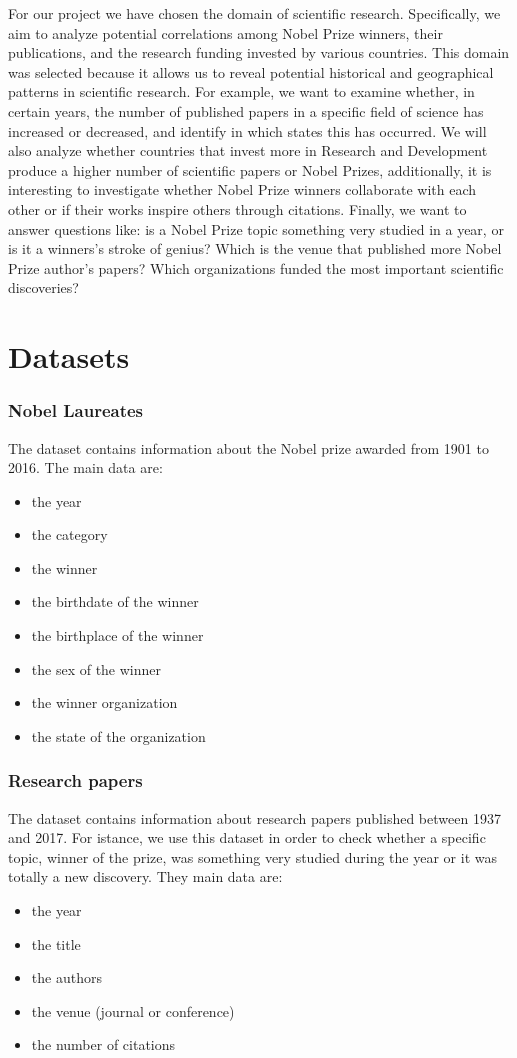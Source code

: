 \documentclass{article}
\begin{document}
For our project we have chosen the domain of scientific research. Specifically, we aim to analyze potential correlations among Nobel Prize winners,
their publications, and the research funding invested by various countries. This domain was selected because it allows us to reveal potential historical
and geographical patterns in scientific research. 
For example, we want to examine whether, in certain years, the number of published papers in a specific field of science has increased or decreased, and
identify in which states this has occurred. We will also analyze whether countries that invest more in Research and Development produce a higher number
of scientific papers or Nobel Prizes, additionally, it is interesting to investigate whether Nobel Prize winners
collaborate with each other or if their works inspire others through citations. Finally, we want to answer questions like: is a Nobel Prize topic something
very studied in a year, or is it a winners's stroke of genius? Which is the venue that published more Nobel Prize author's papers? Which organizations
funded the most important scientific discoveries?
\section*{Datasets}
\subsubsection*{Nobel Laureates}
The dataset contains information about the Nobel prize awarded from 1901 to 2016. The main data are:
\begin{multicols}{2}
  \begin{itemize}
    \item the year
    \item the category
    \item the winner
    \item the birthdate of the winner
    \item the birthplace of the winner
    \item the sex of the winner
    \item the winner organization
    \item the state of the organization
  \end{itemize}
  \end{multicols}
\subsubsection*{Research papers}
The dataset contains information about research papers published between 1937 and 2017. For istance, we use this dataset in order to check whether a
specific topic, winner of the prize, was something very studied during the year or it was totally a new discovery. They main data are:
\begin{itemize}
	\item the year
	\item the title
	\item the authors
	\item the venue (journal or conference)
	\item the number of citations
\end{itemize}
\end{document}
